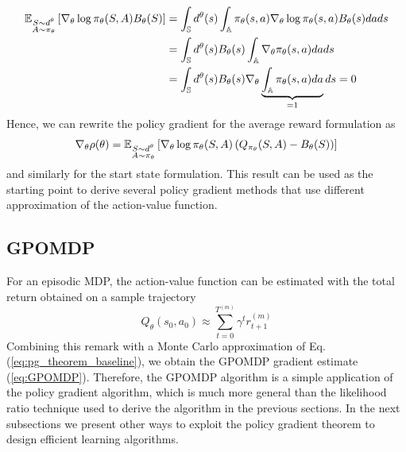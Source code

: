 \begin{equation*}
	\begin{split}
	\E[\substack{S \sim d^\theta\\A \sim \pi_\theta}]{\nabla_\theta\log
			\pi_\theta(S,A) B_\theta(S)} 
	&= \int_\S d^\theta(s) \int_\A \pi_\theta(s,a) \nabla_\theta\log
				\pi_\theta(s,a) B_\theta(s) da ds\\
	&= \int_\S d^\theta(s)  B_\theta(s) \int_\A \nabla_\theta \pi_\theta(s,a) da ds\\
	&= \int_\S d^\theta(s)  B_\theta(s)  \nabla_\theta  \underbrace{\int_\A  \pi_\theta(s,a) da}_{= 1} ds = 0
	\end{split}
\end{equation*}
Hence, we can rewrite the policy gradient for the average reward formulation as
\begin{equation}
\label{eq:pg_theorem_baseline}
	\nabla_\theta \rho(\theta) =
	\E[\substack{S \sim d^\theta\\A \sim \pi_\theta}]{\nabla_\theta\log
	\pi_\theta(S,A) \left(Q_{\pi_\theta}(S, A) - B_\theta(S)\right)}
\end{equation}
and similarly for the start state formulation. This result can be used as the starting point to derive several policy gradient methods that use different approximation of the action-value function. 

\subsection{GPOMDP}
For an episodic MDP, the action-value function can be estimated with the total return obtained on a sample trajectory
\begin{equation*}
	Q_\theta(s_0,a_0) \approx \sum_{t=0}^{T^{(m)}} \gamma^t r_{t+1}^{(m)}
\end{equation*}
Combining this remark with a Monte Carlo approximation of Eq. (\ref{eq:pg_theorem_baseline}), we obtain the GPOMDP gradient estimate (\ref{eq:GPOMDP}). Therefore, the GPOMDP algorithm is a simple application of the policy gradient algorithm, which is much more general than the likelihood ratio technique used to derive the algorithm in the previous sections. In the next subsections we present other ways to exploit the policy gradient theorem to design efficient learning algorithms.

